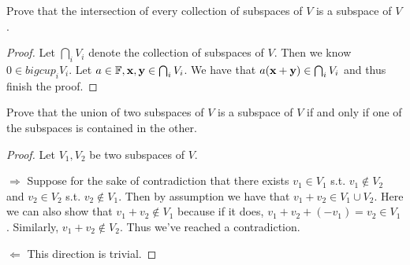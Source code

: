 \documentclass{extarticle}
\begin{document}
\begin{problem}{11}
    Prove that the intersection of every collection of subspaces of \(V\) is a subspace 
    of \(V\). 
\end{problem}

\begin{proof}
Let \(\bigcap_i V_i\) denote the collection of subspaces of \(V\). Then we know 
\(0 \in bigcup_i V_i\). Let \(a \in \mathbb{F}, \mathbf{x}, \mathbf{y} \in \bigcap_i V_i\). We have that
\(a(\mathbf{x} + \mathbf{y}) \in \bigcap_i V_i\) and thus finish the proof.
\end{proof}

\begin{problem}{12}
    Prove that the union of two subspaces of \(V\) is a subspace of \(V\) if 
    and only if one of the subspaces is contained in the other. 
\end{problem}

\begin{proof}
Let \(V_1, V_2\) be two subspaces of \(V\).

\(\Rightarrow\) Suppose for the sake of contradiction that 
there exists \(v_1 \in V_1\) s.t. \(v_1 \notin V_2\) and \(v_2 \in V_2\) s.t. 
\(v_2 \notin V_1\). Then by assumption we have that \(v_1 + v_2 \in V_1 \cup V_2\).
Here we can also show that \(v_1 + v_2 \notin V_1\) because if it does, \(v_1 +
v_2 + (-v_1) = v_2 \in V_1\). Similarly, \(v_1 + v_2 \notin V_2\). Thus we've reached
a contradiction. 

\(\Leftarrow\) This direction is trivial. 
\end{proof}



\end{document}

